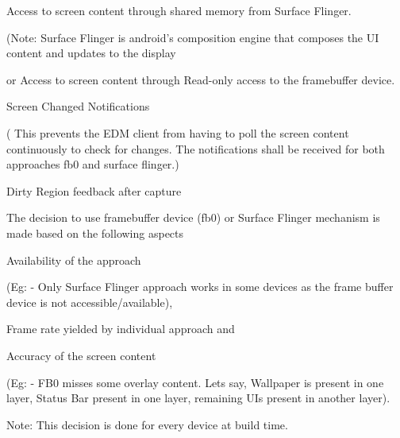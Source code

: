 \begin{DoxyItemize}
\item \-Access to screen content through shared memory from \-Surface \-Flinger. \par
 (\-Note\-: \-Surface \-Flinger is android's composition engine that composes the \-U\-I content and updates to the display\par

\item or \-Access to screen content through \-Read-\/only access to the framebuffer device.\par

\item \-Screen \-Changed \-Notifications\par
 ( \-This prevents the \-E\-D\-M client from having to poll the screen content continuously to check for changes. \-The notifications shall be received for both approaches fb0 and surface flinger.)\par

\item \-Dirty \-Region feedback after capture\par
 
\end{DoxyItemize}

\-The decision to use framebuffer device (fb0) or \-Surface \-Flinger mechanism is made based on the following aspects\par

\begin{DoxyItemize}
\item \-Availability of the approach \par
 (\-Eg\-: -\/ \-Only \-Surface \-Flinger approach works in some devices as the frame buffer device is not accessible/available),\par

\item \-Frame rate yielded by individual approach and \par

\item \-Accuracy of the screen content \par
 (\-Eg\-: -\/ \-F\-B0 misses some overlay content. \-Lets say, \-Wallpaper is present in one layer, \-Status \-Bar present in one layer, remaining \-U\-Is present in another layer). \par
 \-Note\-: \-This decision is done for every device at build time.\par
 
\end{DoxyItemize}

